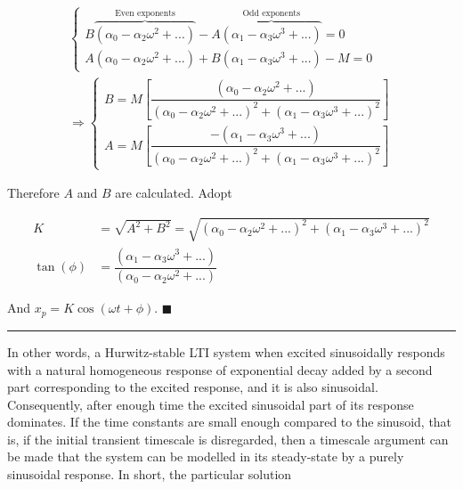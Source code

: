 \begin{gather}
\left\{\begin{array}{l}
	B\overbrace{\left(\alpha_0 - \alpha_2\omega^2 + ...\right)}^{\text{Even exponents}} - A\overbrace{\left(\alpha_1 - \alpha_3\omega^3 + ...\right)}^{\text{Odd exponents}} = 0 \\[3mm]
	A\left(\alpha_0 - \alpha_2\omega^2 + ...\right) + B\left(\alpha_1 - \alpha_3\omega^3 + ...\right) - M= 0
\end{array}\right. \nonumber\\[5mm]
	\Rightarrow\left\{\begin{array}{l}
	B = M \left[\dfrac{\left(\alpha_0 - \alpha_2\omega^2 + ...\right)}{\left(\alpha_0 - \alpha_2\omega^2 + ...\right)^2 + \left(\alpha_1 - \alpha_3\omega^3 + ...\right)^2} \right] \\[10mm]
	A = M \left[\dfrac{-\left(\alpha_1 - \alpha_3\omega^3 + ...\right)}{\left(\alpha_0 - \alpha_2\omega^2 + ...\right)^2 + \left(\alpha_1 - \alpha_3\omega^3 + ...\right)^2} \right]
	\end{array}\right.
\end{gather}

	Therefore $A$ and $B$ are calculated. Adopt

\begin{align}
	K &= \sqrt{A^2 + B^2} = \sqrt{\left(\alpha_0 - \alpha_2\omega^2 + ...\right)^2 + \left(\alpha_1 - \alpha_3\omega^3 + ...\right)^2}\\[3mm]
	\tan\left(\phi\right) &= \dfrac{\left(\alpha_1 - \alpha_3\omega^3 + ...\right)}{\left(\alpha_0 - \alpha_2\omega^2 + ...\right)}
\end{align}

	And $x_p = K\cos\left(\omega t + \phi\right)$. \hfill$\blacksquare$
\vspace{5mm}
\hrule
\vspace{5mm}

	 In other words, a Hurwitz-stable LTI system when excited sinusoidally responds with a natural homogeneous response of exponential decay added by a second part corresponding to the excited response, and it is also sinusoidal. Consequently, after enough time the excited sinusoidal part of its response dominates. If the time constants are small enough compared to the sinusoid, that is, if the initial transient timescale is disregarded, then a timescale argument can be made that the system can be modelled in its steady-state by a purely sinusoidal response. In short, the particular solution

